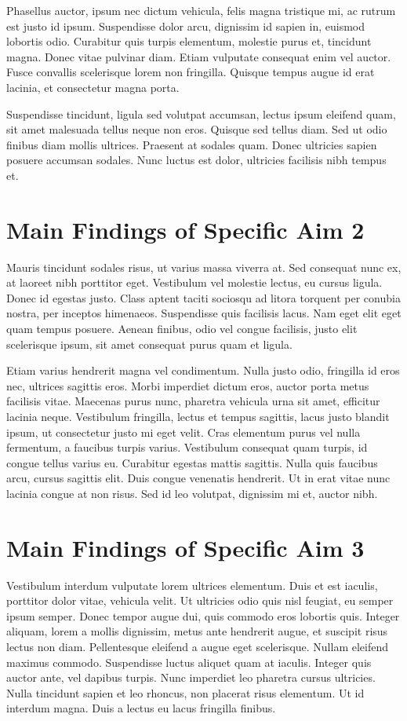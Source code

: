 Phasellus auctor, ipsum nec dictum vehicula, felis magna tristique mi, ac rutrum est justo id ipsum. Suspendisse dolor arcu, dignissim id sapien in, euismod lobortis odio. Curabitur quis turpis elementum, molestie purus et, tincidunt magna. Donec vitae pulvinar diam. Etiam vulputate consequat enim vel auctor. Fusce convallis scelerisque lorem non fringilla. Quisque tempus augue id erat lacinia, et consectetur magna porta.

Suspendisse tincidunt, ligula sed volutpat accumsan, lectus ipsum eleifend quam, sit amet malesuada tellus neque non eros. Quisque sed tellus diam. Sed ut odio finibus diam mollis ultrices. Praesent at sodales quam. Donec ultricies sapien posuere accumsan sodales. Nunc luctus est dolor, ultricies facilisis nibh tempus et. 

\section{Main Findings of Specific Aim 2}

Mauris tincidunt sodales risus, ut varius massa viverra at. Sed consequat nunc ex, at laoreet nibh porttitor eget. Vestibulum vel molestie lectus, eu cursus ligula. Donec id egestas justo. Class aptent taciti sociosqu ad litora torquent per conubia nostra, per inceptos himenaeos. Suspendisse quis facilisis lacus. Nam eget elit eget quam tempus posuere. Aenean finibus, odio vel congue facilisis, justo elit scelerisque ipsum, sit amet consequat purus quam et ligula.

Etiam varius hendrerit magna vel condimentum. Nulla justo odio, fringilla id eros nec, ultrices sagittis eros. Morbi imperdiet dictum eros, auctor porta metus facilisis vitae. Maecenas purus nunc, pharetra vehicula urna sit amet, efficitur lacinia neque. Vestibulum fringilla, lectus et tempus sagittis, lacus justo blandit ipsum, ut consectetur justo mi eget velit. Cras elementum purus vel nulla fermentum, a faucibus turpis varius. Vestibulum consequat quam turpis, id congue tellus varius eu. Curabitur egestas mattis sagittis. Nulla quis faucibus arcu, cursus sagittis elit. Duis congue venenatis hendrerit. Ut in erat vitae nunc lacinia congue at non risus. Sed id leo volutpat, dignissim mi et, auctor nibh.


\section{Main Findings of Specific Aim 3}
Vestibulum interdum vulputate lorem ultrices elementum. Duis et est iaculis, porttitor dolor vitae, vehicula velit. Ut ultricies odio quis nisl feugiat, eu semper ipsum semper. Donec tempor augue dui, quis commodo eros lobortis quis. Integer aliquam, lorem a mollis dignissim, metus ante hendrerit augue, et suscipit risus lectus non diam. Pellentesque eleifend a augue eget scelerisque. Nullam eleifend maximus commodo. Suspendisse luctus aliquet quam at iaculis. Integer quis auctor ante, vel dapibus turpis. Nunc imperdiet leo pharetra cursus ultricies. Nulla tincidunt sapien et leo rhoncus, non placerat risus elementum. Ut id interdum magna. Duis a lectus eu lacus fringilla finibus.

